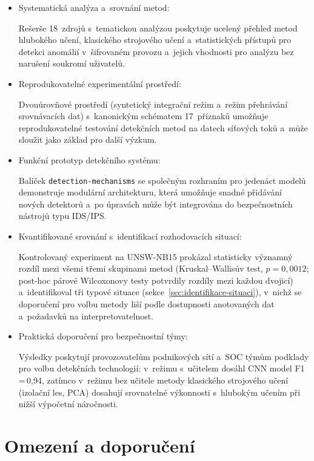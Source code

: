 \begin{itemize}
\item Systematická analýza a~srovnání metod:

Rešerše 18~zdrojů s~tematickou analýzou poskytuje ucelený přehled metod hlubokého učení, klasického strojového učení a~statistických přístupů pro detekci anomálií v~šifrovaném provozu a~jejich vhodnosti pro analýzu bez narušení soukromí uživatelů.

\item Reprodukovatelné experimentální prostředí:

Dvouúrovňové prostředí (syntetický integrační režim a~režim přehrávání srovnávacích dat) s~kanonickým schématem 17~příznaků umožňuje reprodukovatelné testování detekčních metod na datech síťových toků a~může sloužit jako základ pro další výzkum.

\item Funkční prototyp detekčního systému:

Balíček \texttt{detection-mechanisms} se společným rozhraním pro jedenáct modelů demonstruje modulární architekturu, která umožňuje snadné přidávání nových detektorů a~po úpravách může být integrována do bezpečnostních nástrojů typu IDS/IPS.

\item Kvantifikované srovnání s~identifikací rozhodovacích situací:

Kontrolovaný experiment na UNSW-NB15 prokázal statisticky významný rozdíl mezi všemi třemi skupinami metod (Kruskal--Wallisův test, $p = 0{,}0012$; post-hoc párové Wilcoxonovy testy potvrdily rozdíly mezi každou dvojicí) a~identifikoval tři typové situace (sekce~\ref{sec:identifikace-situaci}), v~nichž se doporučení pro volbu metody liší podle dostupnosti anotovaných dat a~požadavků na interpretovatelnost.

\item Praktická doporučení pro bezpečnostní týmy:

Výsledky poskytují provozovatelům podnikových sítí a~SOC týmům podklady pro volbu detekčních technologií: v~režimu s~učitelem dosáhl CNN model F1\,=\,0{,}94, zatímco v~režimu bez učitele metody klasického strojového učení (izolační les, PCA) dosahují srovnatelné výkonnosti s~hlubokým učením při nižší výpočetní náročnosti.
\end{itemize}

\section*{Omezení a doporučení}

